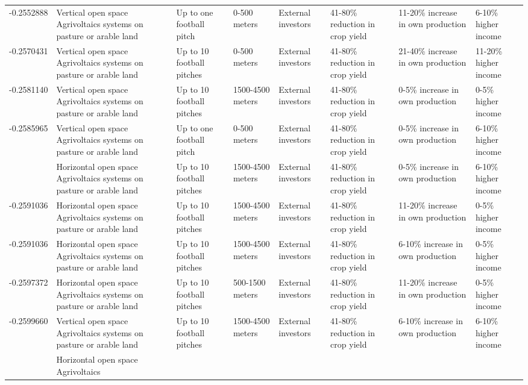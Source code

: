\begin{table}
\begin{tabular}[t]{rlllllll}
-0.2552888 & Vertical open space Agrivoltaics
systems on pasture or arable land & Up to one football pitch & 0-500 meters & External investors & 41-80\% reduction in crop yield & 11-20\% increase in own production & 6-10\% higher income\\
-0.2570431 & Vertical open space Agrivoltaics
systems on pasture or arable land & Up to 10 football pitches & 0-500 meters & External investors & 41-80\% reduction in crop yield & 21-40\% increase in own production & 11-20\% higher income\\
-0.2581140 & Vertical open space Agrivoltaics
systems on pasture or arable land & Up to 10 football pitches & 1500-4500 meters & External investors & 41-80\% reduction in crop yield & 0-5\% increase in own production & 0-5\% higher income\\
-0.2585965 & Vertical open space Agrivoltaics
systems on pasture or arable land & Up to one football pitch & 0-500 meters & External investors & 41-80\% reduction in crop yield & 0-5\% increase in own production & 6-10\% higher income\\
\addlinespace
-0.2587873 & Horizontal open space Agrivoltaics
systems on pasture or arable land & Up to 10 football pitches & 1500-4500 meters & External investors & 41-80\% reduction in crop yield & 0-5\% increase in own production & 6-10\% higher income\\
-0.2591036 & Horizontal open space Agrivoltaics
systems on pasture or arable land & Up to 10 football pitches & 1500-4500 meters & External investors & 41-80\% reduction in crop yield & 11-20\% increase in own production & 0-5\% higher income\\
-0.2591036 & Horizontal open space Agrivoltaics
systems on pasture or arable land & Up to 10 football pitches & 1500-4500 meters & External investors & 41-80\% reduction in crop yield & 6-10\% increase in own production & 0-5\% higher income\\
-0.2597372 & Horizontal open space Agrivoltaics
systems on pasture or arable land & Up to 10 football pitches & 500-1500 meters & External investors & 41-80\% reduction in crop yield & 11-20\% increase in own production & 0-5\% higher income\\
-0.2599660 & Vertical open space Agrivoltaics
systems on pasture or arable land & Up to 10 football pitches & 1500-4500 meters & External investors & 41-80\% reduction in crop yield & 6-10\% increase in own production & 6-10\% higher income\\
\addlinespace
-0.2614104 & Horizontal open space Agrivoltaics

\end{tabular}
\end{table}
